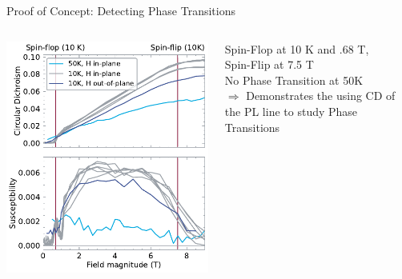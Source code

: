 \documentclass[
	10pt,
]{beamer}
\begin{document}
\begin{frame}{Proof of Concept: Detecting Phase Transitions}
	\begin{columns}
		\includegraphics[width=\textwidth]{../figures/2024-04-10 combined.pdf}
		
		Spin-Flop at 10 K and .68 T,\\
		Spin-Flip at 7.5 T\\
		No Phase Transition at 50K\\
		{\color{seeblau}$\Rightarrow$} Demonstrates the using CD of the PL line to study Phase Transitions


\end{columns}
\end{frame}
\end{document}
